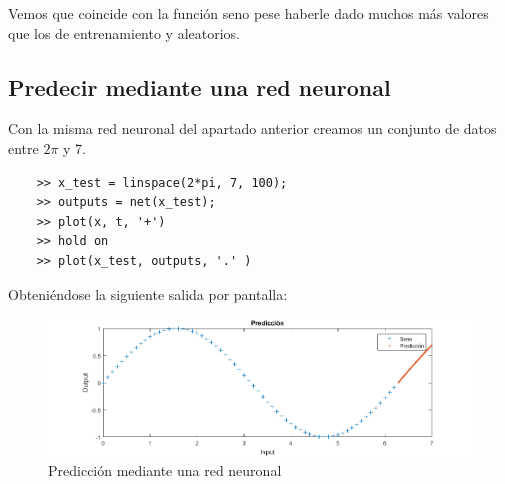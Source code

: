 \documentclass[a4paper, fontsize=11pt]{scrartcl} %
\numberwithin{equation}{section} %
\numberwithin{figure}{section} %
\numberwithin{table}{section} %
\begin{document}
	Vemos que coincide con la función seno pese haberle dado muchos más valores que los de entrenamiento y aleatorios.
	
	\subsection{Predecir mediante una red neuronal}
	
	Con la misma red neuronal del apartado anterior creamos un conjunto de datos entre $2\pi$ y 7.
	
	\begin{lstlisting}
	>> x_test = linspace(2*pi, 7, 100);
	>> outputs = net(x_test);
	>> plot(x, t, '+')
	>> hold on
	>> plot(x_test, outputs, '.' )
	\end{lstlisting}
	
	Obteniéndose la siguiente salida por pantalla:
	
	\begin{figure}[h!]
		\centering
		\includegraphics[width=1.0\linewidth]{images/prediccion.PNG}
		\caption{Predicción mediante una red neuronal}
		\label{prediccion}
	\end{figure}
	\FloatBarrier
	
\end{document}
